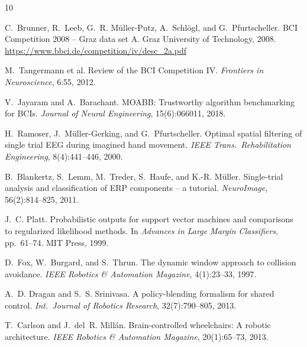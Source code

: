 \documentclass[11pt,a4paper]{article}
\begin{document}
\begin{thebibliography}{10}\small
\setlength{\itemsep}{1pt}

C.~Brunner, R.~Leeb, G.~R. M\"uller-Putz, A.~Schl\"ogl, and G.~Pfurtscheller.
BCI Competition 2008 -- Graz data set A. Graz University of Technology,
2008. \url{https://www.bbci.de/competition/iv/desc_2a.pdf}

M.~Tangermann et al.
Review of the BCI Competition IV.
\emph{Frontiers in Neuroscience}, 6:55, 2012.

V.~Jayaram and A.~Barachant.
MOABB: Trustworthy algorithm benchmarking for BCIs.
\emph{Journal of Neural Engineering}, 15(6):066011, 2018.

H.~Ramoser, J.~M\"uller-Gerking, and G.~Pfurtscheller.
Optimal spatial filtering of single trial EEG during imagined hand movement.
\emph{IEEE Trans.\ Rehabilitation Engineering}, 8(4):441--446, 2000.

B.~Blankertz, S.~Lemm, M.~Treder, S.~Haufe, and K.-R. M\"uller.
Single-trial analysis and classification of ERP components -- a tutorial.
\emph{NeuroImage}, 56(2):814--825, 2011.

J.~C. Platt.
Probabilistic outputs for support vector machines and comparisons to
regularized likelihood methods.
In \emph{Advances in Large Margin Classifiers}, pp.\ 61--74. MIT Press, 1999.

D.~Fox, W.~Burgard, and S.~Thrun.
The dynamic window approach to collision avoidance.
\emph{IEEE Robotics \& Automation Magazine}, 4(1):23--33, 1997.

A.~D. Dragan and S.~S. Srinivasa.
A policy-blending formalism for shared control.
\emph{Int.\ Journal of Robotics Research}, 32(7):790--805, 2013.

T.~Carlson and J.~del~R. Mill\'an.
Brain-controlled wheelchairs: A robotic architecture.
\emph{IEEE Robotics \& Automation Magazine}, 20(1):65--73, 2013.

\end{thebibliography}
\end{document}
